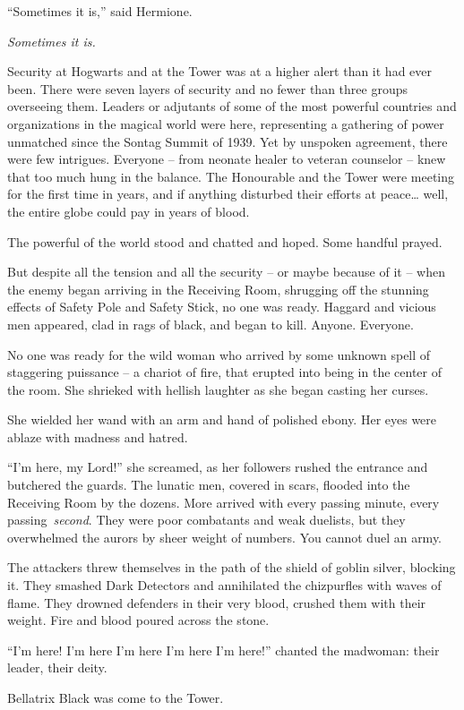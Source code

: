 ``Sometimes it is,'' said Hermione.

\emph{Sometimes it is.}

\mybreak

Security at Hogwarts and at the Tower was at a higher alert than it had
ever been. There were seven layers of security and no fewer than three
groups overseeing them. Leaders or adjutants of some of the most
powerful countries and organizations in the magical world were here,
representing a gathering of power unmatched since the Sontag Summit of
1939. Yet by unspoken agreement, there were few intrigues. Everyone --
from neonate healer to veteran counselor -- knew that too much hung in
the balance. The Honourable and the Tower were meeting for the first
time in years, and if anything disturbed their efforts at peace\ldots{}
well, the entire globe could pay in years of blood.

The powerful of the world stood and chatted and hoped. Some handful
prayed.

But despite all the tension and all the security -- or maybe because of
it -- when the enemy began arriving in the Receiving Room, shrugging off
the stunning effects of Safety Pole and Safety Stick, no one was ready.
Haggard and vicious men appeared, clad in rags of black, and began to
kill. Anyone. Everyone.

No one was ready for the wild woman who arrived by some unknown spell of
staggering puissance -- a chariot of fire, that erupted into being in
the center of the room. She shrieked with hellish laughter as she began
casting her curses.

She wielded her wand with an arm and hand of polished ebony. Her eyes
were ablaze with madness and hatred.

``I'm here, my Lord!'' she screamed, as her followers rushed the
entrance and butchered the guards. The lunatic men, covered in scars,
flooded into the Receiving Room by the dozens. More arrived with every
passing minute, every passing~\emph{second}. They were poor combatants
and weak duelists, but they overwhelmed the aurors by sheer weight of
numbers. You cannot duel an army.

The attackers threw themselves in the path of the shield of goblin
silver, blocking it. They smashed Dark Detectors and annihilated the
chizpurfles with waves of flame. They drowned defenders in their very
blood, crushed them with their weight. Fire and blood poured across the
stone.

``I'm here! I'm here I'm here I'm here I'm here!'' chanted the madwoman:
their leader, their deity.

Bellatrix Black was come to the Tower.
